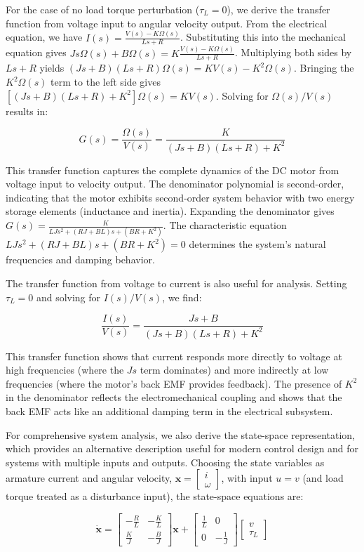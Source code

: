 For the case of no load torque perturbation ($\tau_L = 0$), we derive the transfer function from voltage input to angular velocity output. From the electrical equation, we have $I(s) = \frac{V(s) - K \Omega(s)}{Ls + R}$. Substituting this into the mechanical equation gives $J s \Omega(s) + B \Omega(s) = K \frac{V(s) - K \Omega(s)}{Ls + R}$. Multiplying both sides by $Ls + R$ yields $(J s + B)(Ls + R) \Omega(s) = K V(s) - K^2 \Omega(s)$. Bringing the $K^2 \Omega(s)$ term to the left side gives $[(J s + B)(Ls + R) + K^2] \Omega(s) = K V(s)$. Solving for $\Omega(s)/V(s)$ results in:

$$
G(s) = \frac{\Omega(s)}{V(s)} = \frac{K}{(J s + B)(L s + R) + K^2}
$$

This transfer function captures the complete dynamics of the DC motor from voltage input to velocity output. The denominator polynomial is second-order, indicating that the motor exhibits second-order system behavior with two energy storage elements (inductance and inertia). Expanding the denominator gives $G(s) = \frac{K}{LJ s^2 + (RJ + BL) s + (BR + K^2)}$. The characteristic equation $LJ s^2 + (RJ + BL)s + (BR + K^2) = 0$ determines the system's natural frequencies and damping behavior.

The transfer function from voltage to current is also useful for analysis. Setting $\tau_L = 0$ and solving for $I(s)/V(s)$, we find:

$$
\frac{I(s)}{V(s)} = \frac{J s + B}{(J s + B)(L s + R) + K^2}
$$

This transfer function shows that current responds more directly to voltage at high frequencies (where the $Js$ term dominates) and more indirectly at low frequencies (where the motor's back EMF provides feedback). The presence of $K^2$ in the denominator reflects the electromechanical coupling and shows that the back EMF acts like an additional damping term in the electrical subsystem.

For comprehensive system analysis, we also derive the state-space representation, which provides an alternative description useful for modern control design and for systems with multiple inputs and outputs. Choosing the state variables as armature current and angular velocity, $\mathbf{x} = \begin{bmatrix} i \\ \omega \end{bmatrix}$, with input $u = v$ (and load torque treated as a disturbance input), the state-space equations are:

$$
\dot{\mathbf{x}} = \begin{bmatrix}
-\frac{R}{L} & -\frac{K}{L} \\
\frac{K}{J} & -\frac{B}{J}
\end{bmatrix} \mathbf{x} + \begin{bmatrix}
\frac{1}{L} & 0 \\
0 & -\frac{1}{J}
\end{bmatrix} \begin{bmatrix} v \\ \tau_L \end{bmatrix}
$$

